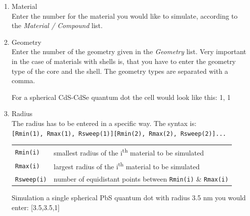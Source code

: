 			\begin{enumerate}
				\item Material		\\
							Enter the number for the material you would like to simulate, according to the {\it Material / Compound} list.
				\item Geometry		\\
							Enter the number of the geometry given in the {\it Geometry} list. Very important in the case of materials with
							shells is, that you have to enter the geometry type of the core and the shell. The geometry types are separated	
							with a comma.
							\begin{EXAMPLE}
								For a spherical CdS-CdSe quantum dot the cell would look like this: 1, 1
							\end{EXAMPLE}
				\item Radius			\\
							The radius has to be entered in a specific way. The syntax is: \\
							\verb|[Rmin(1), Rmax(1), Rsweep(1)][Rmin(2), Rmax(2), Rsweep(2)]...| \\
							\newline
							\begin{tabular}{@{}ll}
								\verb|Rmin(i)|		& smallest radius of the i\textsuperscript{th} material to be simulated				\\
								\verb|Rmax(i)|		& largest radius of the i\textsuperscript{th} material to be simulated				\\
								\verb|Rsweep(i)|	& number of equidistant points between \verb|Rmin(i)| \& \verb|Rmax(i)|		\\
							\end{tabular}
							
							\begin{EXAMPLE}
								Simulation a single spherical PbS quantum dot with radius 3.5 nm you would enter: [3.5,3.5,1]
							\end{EXAMPLE}
							

\end{enumerate}
